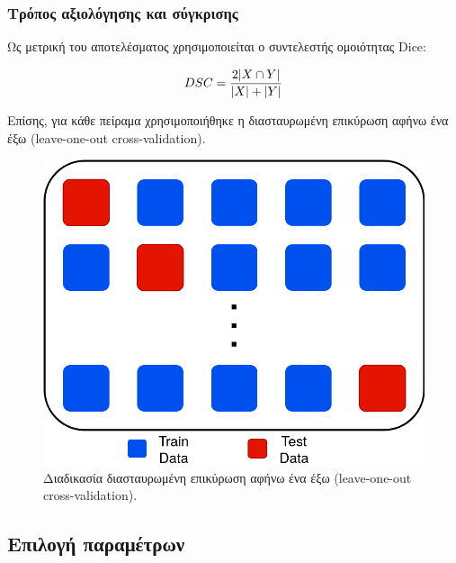 \documentclass{beamer}
\DeclarePairedDelimiter\abs{\lvert}{\rvert}
\begin{document}
\begin{frame}
\frametitle{Τρόπος αξιολόγησης και σύγκρισης}

Ως μετρική του αποτελέσματος χρησιμοποιείται ο συντελεστής ομοιότητας Dice: 

\begin{equation*}
    DSC = \frac{2 \abs{X \cap Y}} {\abs{X} + \abs{Y}}
\end{equation*}

Επίσης, για κάθε πείραμα χρησιμοποιήθηκε η διασταυρωμένη επικύρωση αφήνω ένα έξω
(leave-one-out cross-validation).  

\begin{figure}[H]
    \centering
    \includegraphics[height=0.4\textheight]{leave_one_out}
    \caption{Διαδικασία διασταυρωμένη επικύρωση αφήνω ένα έξω (leave-one-out
             cross-validation).}
\end{figure}

\end{frame}


\subsection{Επιλογή παραμέτρων}
\end{document}
